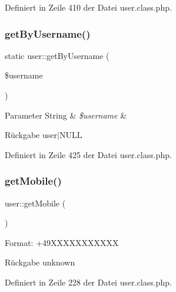 Definiert in Zeile 410 der Datei user.\+class.\+php.

\mbox{\label{classuser_a22d9a9cdd45177624c5d0bd471de016d}} 
\subsubsection{\texorpdfstring{get\+By\+Username()}{getByUsername()}}
{\footnotesize\ttfamily static user\+::get\+By\+Username (\begin{DoxyParamCaption}\item[{}]{\$username }\end{DoxyParamCaption})\hspace{0.3cm}{\ttfamily [static]}}


\begin{DoxyParams}[1]{Parameter}
String & {\em \$username} & \\
\hline
\end{DoxyParams}
\begin{DoxyReturn}{Rückgabe}
user$\vert$\+N\+U\+LL 
\end{DoxyReturn}


Definiert in Zeile 425 der Datei user.\+class.\+php.

\mbox{\label{classuser_a76dafe0634df22989f5641b832cd78c9}} 
\subsubsection{\texorpdfstring{get\+Mobile()}{getMobile()}}
{\footnotesize\ttfamily user\+::get\+Mobile (\begin{DoxyParamCaption}{ }\end{DoxyParamCaption})}

Format\+: +49\+X\+X\+X\+X\+X\+X\+X\+X\+X\+XX \begin{DoxyReturn}{Rückgabe}
unknown 
\end{DoxyReturn}


Definiert in Zeile 228 der Datei user.\+class.\+php.

\mbox{\label{classuser_a5bebc6c83c72242d794bce2da101e9bc}} 
